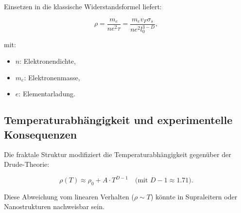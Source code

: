 Einsetzen in die klassische Widerstandsformel liefert:

\begin{equation}
\rho = \frac{m_e}{n e^2 \tau} = \frac{m_e v_F \sigma_s}{n e^2 l_0^{3-D}},
\end{equation}

mit:
\begin{itemize}
\item $n$: Elektronendichte,
\item $m_e$: Elektronenmasse,
\item $e$: Elementarladung.
\end{itemize}

\subsection{Temperaturabhängigkeit und experimentelle Konsequenzen}
Die fraktale Struktur modifiziert die Temperaturabhängigkeit gegenüber der Drude-Theorie:

\begin{equation}
\rho(T) \approx \rho_0 + A \cdot T^{D-1} \quad \text{(mit } D-1 \approx 1.71\text{)}.
\end{equation}

Diese Abweichung vom linearen Verhalten ($\rho \sim T$) könnte in Supraleitern oder Nanostrukturen nachweisbar sein.
